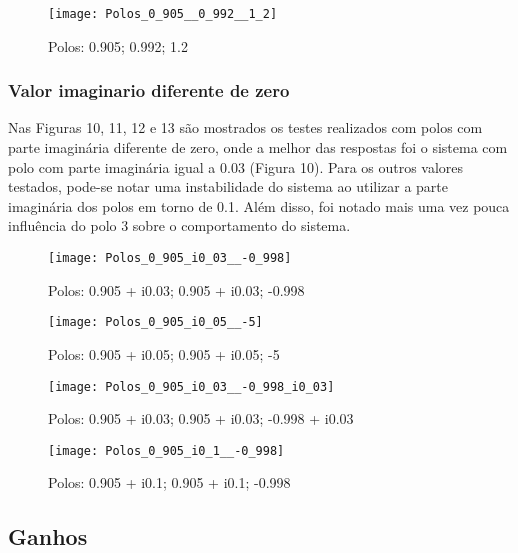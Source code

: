\documentclass[a4paper,12pt]{article}
\begin{document}
\newpage

\thispagestyle{main}

\begin{figure}[h!]
\texttt{[image: Polos\_0\_905\_\_0\_992\_\_1\_2]}
\caption{Polos: 0.905; 0.992; 1.2}
\end{figure}

\newpage

\thispagestyle{main}

\subsubsection{Valor imaginario diferente de zero}

\hspace{4ex}Nas Figuras 10, 11, 12 e 13 são mostrados os testes realizados com polos com parte imaginária diferente de zero, onde a melhor das respostas foi o sistema com polo com parte imaginária igual a 0.03 (Figura 10).
Para os outros valores testados, pode-se notar uma instabilidade do sistema ao utilizar a parte imaginária dos polos em torno de 0.1. Além disso, foi notado mais uma vez pouca influência do polo 3 sobre o comportamento do sistema. 

\begin{figure}[h!]
\texttt{[image: Polos\_0\_905\_i0\_03\_\_-0\_998]}
\caption{Polos: 0.905 + i0.03; 0.905 + i0.03; -0.998}
\end{figure}

\begin{figure}[h!]
\texttt{[image: Polos\_0\_905\_i0\_05\_\_-5]}
\caption{Polos: 0.905 + i0.05; 0.905 + i0.05; -5}
\end{figure}

\newpage

\thispagestyle{main}

\begin{figure}[h!]
\texttt{[image: Polos\_0\_905\_i0\_03\_\_-0\_998\_i0\_03]}
\caption{Polos: 0.905 + i0.03; 0.905 + i0.03; -0.998 + i0.03}
\end{figure}

\begin{figure}[h!]
\texttt{[image: Polos\_0\_905\_i0\_1\_\_-0\_998]}
\caption{Polos: 0.905 + i0.1; 0.905 + i0.1; -0.998}
\end{figure}

\newpage

\thispagestyle{main}

\subsection{Ganhos}
\end{document}
